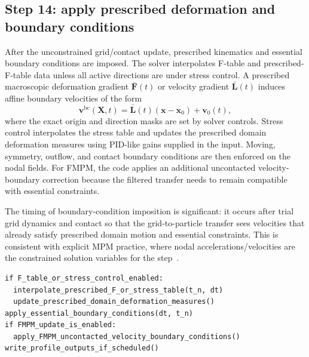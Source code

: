 \subsection{Step 14: apply prescribed deformation and boundary conditions}
\label{subsec:solver-step-14}
After the unconstrained grid/contact update, prescribed kinematics and essential boundary conditions are imposed.  The solver interpolates F-table and prescribed-F-table data unless all active directions are under stress control.  A prescribed macroscopic deformation gradient $\bar{\mathbf{F}}(t)$ or velocity gradient $\bar{\mathbf{L}}(t)$ induces affine boundary velocities of the form
\begin{equation}
  \mathbf{v}^{\mathrm{bc}}(\mathbf{X},t) = \bar{\mathbf{L}}(t)\left(\mathbf{x}-\mathbf{x}_0\right) + \mathbf{v}_0(t),
\end{equation}
where the exact origin and direction masks are set by solver controls.  Stress control interpolates the stress table and updates the prescribed domain deformation measures using PID-like gains supplied in the input.  Moving, symmetry, outflow, and contact boundary conditions are then enforced on the nodal fields.  For FMPM, the code applies an additional uncontacted velocity-boundary correction because the filtered transfer needs to remain compatible with essential constraints.

The timing of boundary-condition imposition is significant: it occurs after trial grid dynamics and contact so that the grid-to-particle transfer sees velocities that already satisfy prescribed domain motion and essential constraints.  This is consistent with explicit MPM practice, where nodal accelerations/velocities are the constrained solution variables for the step~\cite{wallstedt2008explicit,steffen2008choices}.

\begin{lstlisting}[caption={Prescribed deformation and essential boundary conditions.},basicstyle=\ttfamily\small]
if F_table_or_stress_control_enabled:
  interpolate_prescribed_F_or_stress_table(t_n, dt)
  update_prescribed_domain_deformation_measures()
apply_essential_boundary_conditions(dt, t_n)
if FMPM_update_is_enabled:
  apply_FMPM_uncontacted_velocity_boundary_conditions()
write_profile_outputs_if_scheduled()
\end{lstlisting}

